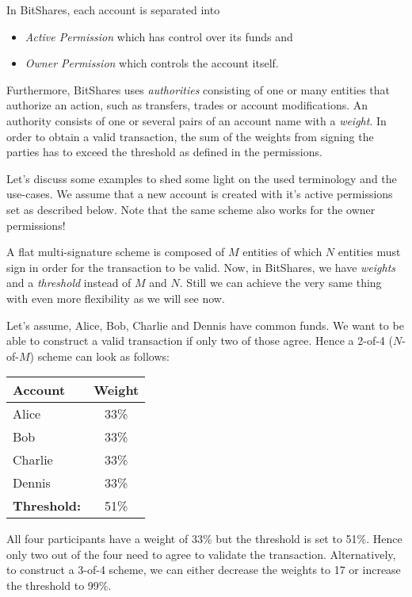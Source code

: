 In BitShares, each account is separated into
\begin{itemize}
 \item \emph{Active Permission} which has control over its funds and
 \item \emph{Owner Permission} which controls the account itself.
\end{itemize}

Furthermore, BitShares uses \emph{authorities} consisting of one or many
entities that authorize an action, such as transfers, trades or account
modifications. An authority consists of one or several pairs of an account name
with a \emph{weight}. In order to obtain a valid transaction, the sum of the
weights from signing the parties has to exceed the threshold as defined in the
permissions.

Let's discuss some examples to shed some light on the used terminology and the
use-cases. We assume that a new account is created with it's active permissions
set as described below. Note that the same scheme also works for the owner
permissions!

A flat multi-signature scheme is composed of $M$ entities of which $N$ entities
must sign in order for the transaction to be valid. Now, in BitShares, we have
\emph{weights} and a \emph{threshold} instead of $M$ and $N$. Still we can
achieve the very same thing with even more flexibility as we will see now.

Let's assume, Alice, Bob, Charlie and Dennis have common funds. We want to be
able to construct a valid transaction if only two of those agree. Hence a
2-of-4 ($N$-of-$M$) scheme can look as follows:

\begin{center}
 \begin{tabular}{l|c}
  \hline
  Account             & Weight\\\hline\hline
  Alice               & 33\%\\
  Bob                 & 33\%\\
  Charlie             & 33\%\\
  Dennis              & 33\%\\\hline\hline
  \textbf{Threshold:} & 51\%\\
  \hline
 \end{tabular}
\end{center}

All four participants have a weight of 33\% but the threshold is set to 51\%.
Hence only two out of the four need to agree to validate the transaction.
Alternatively, to construct a 3-of-4 scheme, we can either decrease the weights
to 17 or increase the threshold to 99\%.

